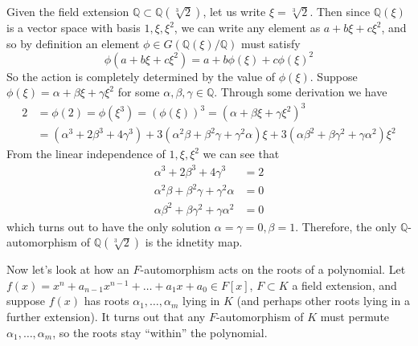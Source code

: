   \begin{example}
    Given the field extension $\mathbb{Q} \subset \mathbb{Q}(\sqrt[3]{2})$, let us write $\xi = \sqrt[3]{2}$. Then since $\mathbb{Q}(\xi)$ is a vector space with basis $1, \xi, \xi^2$, we can write any element as $a + b \xi + c \xi^2$, and so by definition an element $\phi \in G(\mathbb{Q}(\xi)/\mathbb{Q})$ must satisfy 
    \begin{equation}
      \phi(a + b \xi + c \xi^2) = a + b \phi(\xi) + c \phi(\xi)^2
    \end{equation}
    So the action is completely determined by the value of $\phi(\xi)$. Suppose $\phi(\xi) = \alpha + \beta \xi + \gamma \xi^2$ for some $\alpha, \beta, \gamma \in \mathbb{Q}$. Through some derivation we have 
    \begin{align}
      2 & = \phi(2) = \phi(\xi^3) = (\phi(\xi))^3 = (\alpha + \beta \xi + \gamma \xi^2)^3 \\ 
        & = (\alpha^3 + 2\beta^3 + 4\gamma^3) + 3(\alpha^2\beta + \beta^2\gamma + \gamma^2\alpha)\xi + 3(\alpha\beta^2 + \beta\gamma^2 + \gamma\alpha^2)\xi^2
    \end{align} 
    From the linear independence of $1, \xi, \xi^2$ we can see that 
    \begin{align}
      \alpha^3 + 2\beta^3 + 4\gamma^3 &= 2 \\
      \alpha^2\beta + \beta^2\gamma + \gamma^2\alpha &= 0 \\
      \alpha\beta^2 + \beta\gamma^2 + \gamma\alpha^2 &= 0
    \end{align}
    which turns out to have the only solution $\alpha = \gamma = 0, \beta = 1$. Therefore, the only $\mathbb{Q}$-automorphism of $\mathbb{Q}(\sqrt[3]{2})$ is the idnetity map. 
  \end{example} 

  Now let's look at how an $F$-automorphism acts on the roots of a polynomial. Let $f(x) = x^n + a_{n-1} x^{n-1} + \ldots + a_1 x + a_0 \in F[x]$, $F \subset K$ a field extension, and suppose $f(x)$ has roots $\alpha_1, \ldots, \alpha_m$ lying in $K$ (and perhaps other roots lying in a further extension). It turns out that any $F$-automorphism of $K$ must permute $\alpha_1, \ldots, \alpha_m$, so the roots stay ``within'' the polynomial. 

